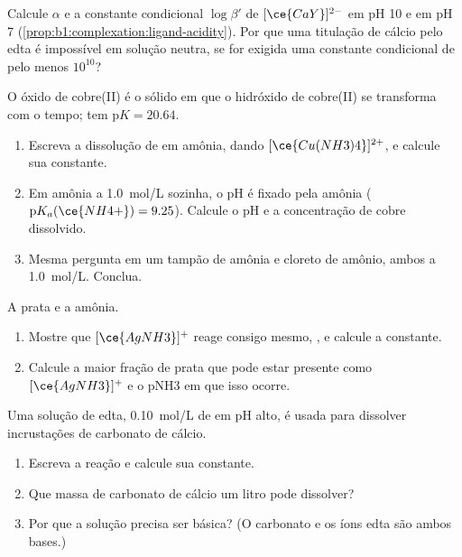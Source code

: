 \begin{exercise}[$\star\star$]\label{exo:b1:complexation:9}
Calcule $\alpha$ e a constante condicional $\log\beta'$ de $[\ce{CaY}]^{2-}$
em pH 10 e em pH 7 (\cref{prop:b1:complexation:ligand-acidity}). Por que
uma titulação de cálcio pelo edta é impossível em solução neutra, se for
exigida uma constante condicional de pelo menos $10^{10}$?
\end{exercise}

\begin{exercise}[$\star\star\star$]\label{exo:b1:complexation:10}
O óxido de cobre(II)  é o sólido em que o hidróxido de cobre(II)
se transforma com o tempo;  tem
$\mathrm{p}K = 20.64$.
\begin{enumerate}
  \item Escreva a dissolução de  em amônia, dando
        $[\ce{Cu(NH3)4}]^{2+}$, e calcule sua constante.
  \item Em amônia a \qty{1.0}{mol/L} sozinha, o pH é fixado pela amônia
        ($\mathrm{p}K_a(\ce{NH4+}) = 9.25$). Calcule o pH e a
        concentração de cobre dissolvido.
  \item Mesma pergunta em um tampão de amônia e cloreto de amônio, ambos
        a \qty{1.0}{mol/L}. Conclua.
\end{enumerate}
\end{exercise}

\begin{exercise}[$\star\star\star$]\label{exo:b1:complexation:11}
A prata e a amônia.
\begin{enumerate}
  \item Mostre que $[\ce{AgNH3}]^{+}$ reage consigo mesmo,
        , e calcule a constante.
  \item Calcule a maior fração de prata que pode estar presente como
        $[\ce{AgNH3}]^{+}$ e o pNH3 em que isso ocorre.
\end{enumerate}
\end{exercise}

\begin{exercise}[$\star\star\star$]\label{exo:b1:complexation:12}
Uma solução de edta, \qty{0.10}{mol/L} de  em pH alto, é usada
para dissolver incrustações de carbonato de cálcio.
\begin{enumerate}
  \item Escreva a reação e calcule sua constante.
  \item Que massa de carbonato de cálcio um litro pode dissolver?
  \item Por que a solução precisa ser básica? (O carbonato e os íons edta
        são ambos bases.)
\end{enumerate}
\end{exercise}

